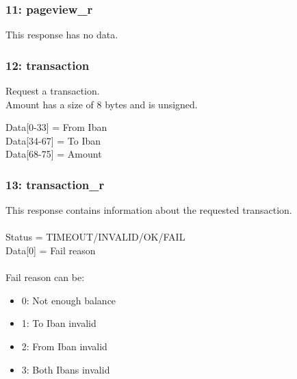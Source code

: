 \documentclass[12pt, a4paper]{article}
\begin{document}
\subsubsection{11: pageview\_r}
This response has no data.

\subsubsection{12: transaction}
Request a transaction.\\
Amount has a size of 8 bytes and is unsigned.

Data[0-33] = From Iban\\
Data[34-67] = To Iban\\
Data[68-75] = Amount\\

\subsubsection{13: transaction\_r}
This response contains information about the requested transaction.\\
\\
Status = TIMEOUT/INVALID/OK/FAIL\\
Data[0] = Fail reason\\
\\
Fail reason can be:
\begin{itemize}
	\item 0: Not enough balance
	\item 1: To Iban invalid
	\item 2: From Iban invalid
	\item 3: Both Ibans invalid
\end{itemize}
\end{document}
